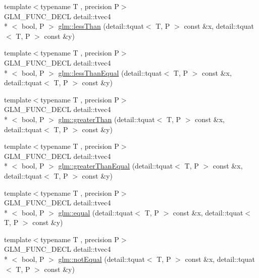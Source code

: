 \begin{DoxyCompactItemize}
\item 
{\footnotesize template$<$typename T , precision P$>$ }\\G\-L\-M\-\_\-\-F\-U\-N\-C\-\_\-\-D\-E\-C\-L detail\-::tvec4\\*
$<$ bool, P $>$ \hyperlink{group__gtc__quaternion_ga4e4c37b86cecde7e1076c5b5fdb920b9}{glm\-::less\-Than} (detail\-::tquat$<$ T, P $>$ const \&x, detail\-::tquat$<$ T, P $>$ const \&y)
\item 
{\footnotesize template$<$typename T , precision P$>$ }\\G\-L\-M\-\_\-\-F\-U\-N\-C\-\_\-\-D\-E\-C\-L detail\-::tvec4\\*
$<$ bool, P $>$ \hyperlink{group__gtc__quaternion_ga313fe20896a8cd43c6d08cc88fa18faa}{glm\-::less\-Than\-Equal} (detail\-::tquat$<$ T, P $>$ const \&x, detail\-::tquat$<$ T, P $>$ const \&y)
\item 
{\footnotesize template$<$typename T , precision P$>$ }\\G\-L\-M\-\_\-\-F\-U\-N\-C\-\_\-\-D\-E\-C\-L detail\-::tvec4\\*
$<$ bool, P $>$ \hyperlink{group__gtc__quaternion_ga63be67bccef0b0ad4e60656223ab3761}{glm\-::greater\-Than} (detail\-::tquat$<$ T, P $>$ const \&x, detail\-::tquat$<$ T, P $>$ const \&y)
\item 
{\footnotesize template$<$typename T , precision P$>$ }\\G\-L\-M\-\_\-\-F\-U\-N\-C\-\_\-\-D\-E\-C\-L detail\-::tvec4\\*
$<$ bool, P $>$ \hyperlink{group__gtc__quaternion_gac90d5af34a03cd665a349ac30e4cc44c}{glm\-::greater\-Than\-Equal} (detail\-::tquat$<$ T, P $>$ const \&x, detail\-::tquat$<$ T, P $>$ const \&y)
\item 
{\footnotesize template$<$typename T , precision P$>$ }\\G\-L\-M\-\_\-\-F\-U\-N\-C\-\_\-\-D\-E\-C\-L detail\-::tvec4\\*
$<$ bool, P $>$ \hyperlink{group__gtc__quaternion_ga32ff2cc6fb576639a6237d8d8ed5818b}{glm\-::equal} (detail\-::tquat$<$ T, P $>$ const \&x, detail\-::tquat$<$ T, P $>$ const \&y)
\item 
{\footnotesize template$<$typename T , precision P$>$ }\\G\-L\-M\-\_\-\-F\-U\-N\-C\-\_\-\-D\-E\-C\-L detail\-::tvec4\\*
$<$ bool, P $>$ \hyperlink{group__gtc__quaternion_gaa3a8cf1aa580e435ca96acafbd7870a5}{glm\-::not\-Equal} (detail\-::tquat$<$ T, P $>$ const \&x, detail\-::tquat$<$ T, P $>$ const \&y)
\end{DoxyCompactItemize}


